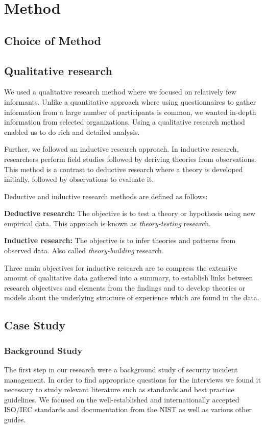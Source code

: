 \chapter{Method}
\section{Choice of Method}


\section{Qualitative research}
\label{sec:qualitativeresearch}
We used a qualitative research method where we focused on relatively few informants. Unlike a quantitative approach where using questionnaires to gather information from a large number of participants is common, we wanted in-depth information from selected organizations. Using a qualitative research method enabled us to do rich and detailed analysis. 

Further, we followed an inductive research approach. In inductive research, researchers perform field studies followed by deriving theories from observations. This method is a contrast to deductive research where a theory is developed initially, followed by observations to evaluate it\cite{oates2005researching}. 

Deductive and inductive research methods are defined as follows\cite{bhattacherjee2012social}: 

\textbf{Deductive research:} The objective is to test a theory or hypothesis using new empirical data. This approach is known as \emph{theory-testing} research.

\textbf{Inductive research:} The objective is to infer theories and patterns from observed data. Also called \emph{theory-building} research.

Three main objectives for inductive research are to compress the extensive amount of qualitative data gathered into a summary, to establish links between research objectives and elements from the findings and to develop theories or models about the underlying structure of experience which are found in the data\cite{thomas2006general}. 

\section{Case Study}
\label{sec:caseStudy}


\subsection{Background Study}
\label{sec:background}
The first step in our research were a background study of security incident management. In order to find appropriate questions for the interviews we found it necessary to study relevant literature such as standards and best practice guidelines. We focused on the well-established and internationally accepted ISO/IEC standards and documentation from the \ac{NIST} as well as various other guides.

